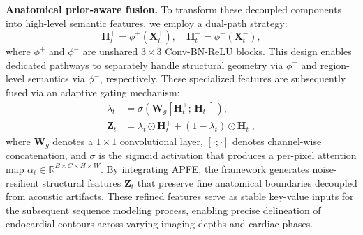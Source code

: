 

\noindent
\textbf{Anatomical prior-aware fusion.}
To transform these decoupled components into high-level semantic features, we employ a dual-path strategy:
\begin{equation}
    \mathbf{H}_t^{+} = \phi^{+}(\mathbf{X}_t^{+}), \quad \mathbf{H}_t^{-} = \phi^{-}(\mathbf{X}_t^{-}),
\end{equation}
where $\phi^{+}$ and $\phi^{-}$ are unshared $3\times3$ Conv-BN-ReLU blocks.
This design enables dedicated pathways to separately handle structural geometry via $\phi^{+}$ and region-level semantics via $\phi^{-}$, respectively.
These specialized features are subsequently fused via an adaptive gating mechanism:
\begin{equation}
\label{eq:gating}
\begin{aligned}
    \lambda_t &= \sigma\!\left( \mathbf{W}_g \left[\mathbf{H}_t^{+};\, \mathbf{H}_t^{-}\right] \right), \\
    \mathbf{Z}_t &= \lambda_t \odot \mathbf{H}_t^{+} + (1 - \lambda_t) \odot \mathbf{H}_t^{-},
\end{aligned}
\end{equation}
where $\mathbf{W}_g$ denotes a $1\times1$ convolutional layer, $[\cdot ; \cdot]$ denotes channel-wise concatenation, and $\sigma$ is the sigmoid activation that produces a per-pixel attention map $\alpha_t \in \mathbb{R}^{B\times C\times H\times W}$.
By integrating APFE, the framework generates noise-resilient structural features $\mathbf{Z}_t$ that preserve fine anatomical boundaries decoupled from acoustic artifacts.
These refined features serve as stable key-value inputs for the subsequent sequence modeling process, enabling precise delineation of endocardial contours across varying imaging depths and cardiac phases.